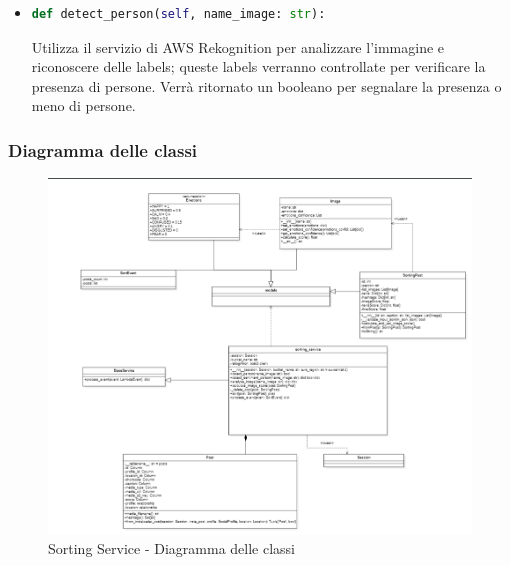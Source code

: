 \begin{itemize}
	\item
	\begin{lstlisting}[language=Python, numbers=none]	
def detect_person(self, name_image: str):
	\end{lstlisting}	
Utilizza il servizio di AWS Rekognition per analizzare l'immagine e riconoscere delle labels; queste labels verranno controllate per verificare la presenza di persone. Verrà ritornato un booleano per segnalare la presenza o meno di persone.
\end{itemize}
\newpage
\subsubsection{Diagramma delle classi}
\begin{figure}[!h]
    \includegraphics[width=15cm]{sezioni/images/cd_sorting.png}
    \caption{Sorting Service - Diagramma delle classi}
\end{figure}
\newpage
